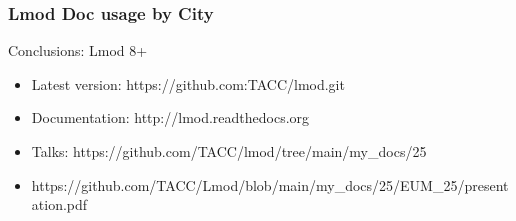 \documentclass{beamer}
\begin{document}
\begin{frame}[fragile]
    \frametitle{Lmod Doc usage by City}
\end{frame}

\begin{frame}{Conclusions: Lmod 8+}
  \begin{itemize}
    \item Latest version: https://github.com:TACC/lmod.git
    \item Documentation:  http://lmod.readthedocs.org
    \item Talks:          https://github.com/TACC/lmod/tree/main/my\_docs/25
    \item https://github.com/TACC/Lmod/blob/main/my\_docs/25/EUM\_25/presentation.pdf
  \end{itemize}
\end{frame}
\end{document}
